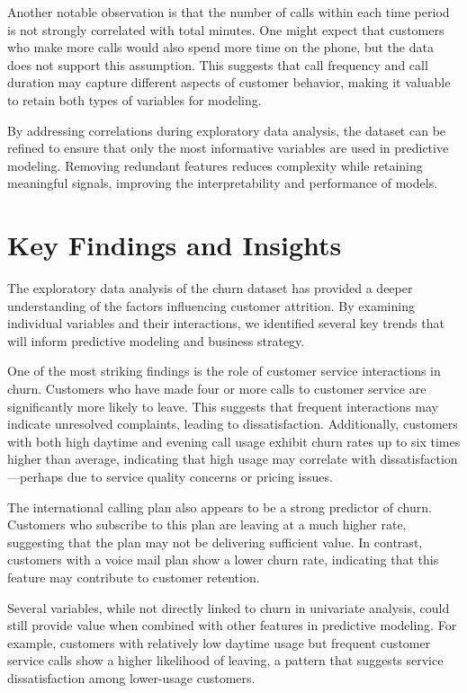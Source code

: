 \documentclass[
]{book}
\theoremstyle{definition}
\theoremstyle{definition}
\theoremstyle{definition}
\theoremstyle{definition}
\theoremstyle{remark}
\begin{document}
Another notable observation is that the number of calls within each time period is not strongly correlated with total minutes. One might expect that customers who make more calls would also spend more time on the phone, but the data does not support this assumption. This suggests that call frequency and call duration may capture different aspects of customer behavior, making it valuable to retain both types of variables for modeling.

By addressing correlations during exploratory data analysis, the dataset can be refined to ensure that only the most informative variables are used in predictive modeling. Removing redundant features reduces complexity while retaining meaningful signals, improving the interpretability and performance of models.

\section{Key Findings and Insights}\label{key-findings-and-insights}

The exploratory data analysis of the churn dataset has provided a deeper understanding of the factors influencing customer attrition. By examining individual variables and their interactions, we identified several key trends that will inform predictive modeling and business strategy.

One of the most striking findings is the role of customer service interactions in churn. Customers who have made four or more calls to customer service are significantly more likely to leave. This suggests that frequent interactions may indicate unresolved complaints, leading to dissatisfaction. Additionally, customers with both high daytime and evening call usage exhibit churn rates up to six times higher than average, indicating that high usage may correlate with dissatisfaction---perhaps due to service quality concerns or pricing issues.

The international calling plan also appears to be a strong predictor of churn. Customers who subscribe to this plan are leaving at a much higher rate, suggesting that the plan may not be delivering sufficient value. In contrast, customers with a voice mail plan show a lower churn rate, indicating that this feature may contribute to customer retention.

Several variables, while not directly linked to churn in univariate analysis, could still provide value when combined with other features in predictive modeling. For example, customers with relatively low daytime usage but frequent customer service calls show a higher likelihood of leaving, a pattern that suggests service dissatisfaction among lower-usage customers.
\end{document}
